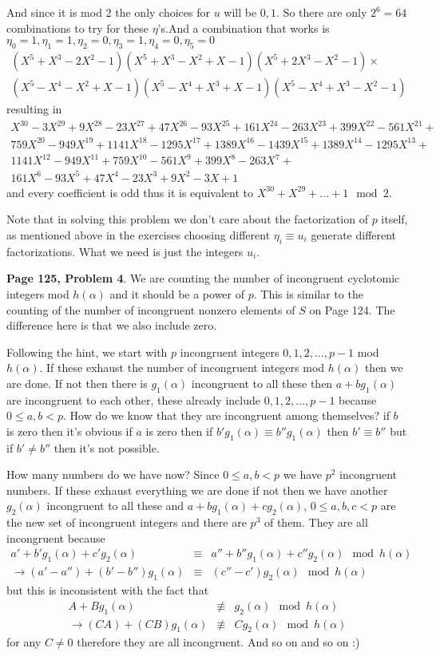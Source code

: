 \documentclass[aps,preprint,preprintnumbers,nofootinbib,showpacs,prd]{revtex4-1}
\newcommand{\nbea}{\begin{eqnarray*}}
\newcommand{\neea}{\end{eqnarray*}}
\begin{document}
And since it is mod 2 the only choices for $u$ will be $0,1$. So there are only $2^6 = 64$ combinations to try for these $\eta$'s.And a combination that works is $\eta_0 = 1, \eta_1 = 1, \eta_2 = 0, \eta_3 = 1, \eta_4 = 0, \eta_5 = 0$
%
\nbea
(X^5+X^3-2X^2-1)(X^5+X^3-X^2+X-1)(X^5+2X^3-X^2-1) \times \\
(X^5-X^4-X^2+X-1)(X^5-X^4+X^3+X-1)(X^5-X^4+X^3-X^2-1)
\neea
%
resulting in
%
\nbea
X^{30}-3X^{29}+9X^{28}-23X^{27}+47X^{26}-93X^{25}+161X^{24}-263X^{23}+399X^{22}-561X^{21}+\\
759X^{20}-949X^{19}+1141X^{18}-1295X^{17}+1389X^{16}-1439X^{15}+1389X^{14}-1295X^{13}+\\
1141X^{12}-949X^{11}+759X^{10}-561X^9+399X^8-263X^7+\\
161X^6-93X^5+47X^4-23X^3+9X^2-3X+1
\neea
%
and every coefficient is odd thus it is equivalent to $X^{30} + X^{29} + \dots + 1 \mod{2}$.

Note that in solving this problem we don't care about the factorization of $p$ itself, as mentioned above in the exercises choosing different $\eta_i \equiv u_i$ generate different factorizations. What we need is just the integers $u_i$.

{\bf Page 125, Problem 4}. We are counting the number of incongruent cyclotomic integers mod $h(\alpha)$ and it should be a power of $p$. This is similar to the counting of the number of incongruent nonzero elements of $S$ on Page 124. The difference here is that we also include zero. 

Following the hint, we start with $p$ incongruent integers $0,1,2,\dots,p-1$ mod $h(\alpha)$. If these exhaust the number of incongruent integers mod $h(\alpha)$ then we are done. If not then there is $g_1(\alpha)$ incongruent to all these then $a + bg_1(\alpha)$ are incongruent to each other, these already include $0,1,2,\dots,p-1$ because $0 \le a, b < p$. How do we know that they are incongruent among themselves? if $b$ is zero then it's obvious if $a$ is zero then if $b'g_1(\alpha) \equiv b''g_1(\alpha)$ then $b' \equiv b''$ but if $b' \neq b''$ then it's not possible.

How many numbers do we have now? Since $0 \le a,b < p$ we have $p^2$ incongruent numbers. If these exhaust everything we are done if not then we have another $g_2(\alpha)$ incongruent to all these and $a + bg_1(\alpha) + cg_2(\alpha)$, $0 \le a,b,c <p$ are the new set of incongruent integers and there are $p^3$ of them. They are all incongruent because
%
\nbea
a' + b'g_1(\alpha) + c'g_2(\alpha) & \equiv & a'' + b''g_1(\alpha) + c''g_2(\alpha) \mod{h(\alpha)} \\
\to (a' - a'') + (b' - b'')g_1(\alpha) & \equiv & (c'' - c') g_2(\alpha) \mod{h(\alpha)}
\neea
%
but this is inconsistent with the fact that
%
\nbea
A + B g_1(\alpha) & \not\equiv & g_2(\alpha) \mod{h(\alpha)} \\
\to (CA) + (CB) g_1(\alpha) &\not\equiv & C g_2(\alpha) \mod{h(\alpha)} 
\neea
%
for any $C \neq 0$ therefore they are all incongruent. And so on and so on :)
\end{document}
